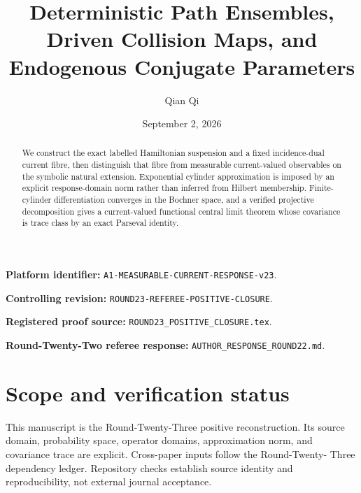 \documentclass[11pt,reqno]{amsart}
\title[Deterministic path ensembles and driven maps]{Deterministic Path Ensembles, Driven Collision Maps, and Endogenous Conjugate Parameters}
\author{Qian Qi}
\date{September 2, 2026}
\theoremstyle{remark}
\begin{document}
\raggedbottom
\begin{abstract}
We construct the exact labelled Hamiltonian suspension and a fixed
incidence-dual current fibre, then distinguish that fibre from measurable
current-valued observables on the symbolic natural extension.  Exponential
cylinder approximation is imposed by an explicit response-domain norm rather
than inferred from Hilbert membership.  Finite-cylinder differentiation
converges in the Bochner space, and a verified projective decomposition gives
a current-valued functional central limit theorem whose covariance is trace
class by an exact Parseval identity.
\end{abstract}
\maketitle
\noindent\textbf{Platform identifier:} \texttt{A1-MEASURABLE-CURRENT-RESPONSE-v23}.\par
\noindent\textbf{Controlling revision:} \texttt{ROUND23-REFEREE-POSITIVE-CLOSURE}.\par
\noindent\textbf{Registered proof source:} \texttt{ROUND23\_POSITIVE\_CLOSURE.tex}.\par
\noindent\textbf{Round-Twenty-Two referee response:} \texttt{AUTHOR\_RESPONSE\_ROUND22.md}.\par
\tableofcontents

\section*{Scope and verification status}
This manuscript is the Round-Twenty-Three positive reconstruction.  Its
source domain, probability space, operator domains, approximation norm, and
covariance trace are explicit.  Cross-paper inputs follow the Round-Twenty-
Three dependency ledger.  Repository checks establish source identity and
reproducibility, not external journal acceptance.
\printbibliography
\end{document}
